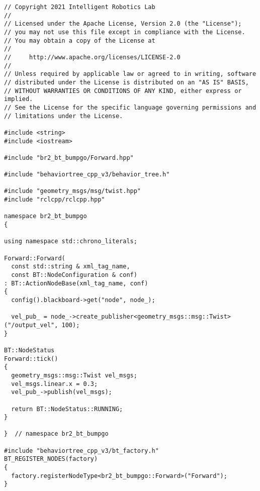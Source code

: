  \footnotesize
\begin{tcolorbox}[sharp corners, colframe=gray!80, colback=LightGray, left=0pt, top=0pt, bottom=0pt, title=\texttt{br2\_bt\_bumpgo/src/br2\_bt\_bumpgo/Forward.cpp}]
  \begin{verbatim}
// Copyright 2021 Intelligent Robotics Lab
//
// Licensed under the Apache License, Version 2.0 (the "License");
// you may not use this file except in compliance with the License.
// You may obtain a copy of the License at
//
//     http://www.apache.org/licenses/LICENSE-2.0
//
// Unless required by applicable law or agreed to in writing, software
// distributed under the License is distributed on an "AS IS" BASIS,
// WITHOUT WARRANTIES OR CONDITIONS OF ANY KIND, either express or implied.
// See the License for the specific language governing permissions and
// limitations under the License.

#include <string>
#include <iostream>

#include "br2_bt_bumpgo/Forward.hpp"

#include "behaviortree_cpp_v3/behavior_tree.h"

#include "geometry_msgs/msg/twist.hpp"
#include "rclcpp/rclcpp.hpp"

namespace br2_bt_bumpgo
{

using namespace std::chrono_literals;

Forward::Forward(
  const std::string & xml_tag_name,
  const BT::NodeConfiguration & conf)
: BT::ActionNodeBase(xml_tag_name, conf)
{
  config().blackboard->get("node", node_);

  vel_pub_ = node_->create_publisher<geometry_msgs::msg::Twist>("/output_vel", 100);
}

BT::NodeStatus
Forward::tick()
{
  geometry_msgs::msg::Twist vel_msgs;
  vel_msgs.linear.x = 0.3;
  vel_pub_->publish(vel_msgs);

  return BT::NodeStatus::RUNNING;
}

}  // namespace br2_bt_bumpgo

#include "behaviortree_cpp_v3/bt_factory.h"
BT_REGISTER_NODES(factory)
{
  factory.registerNodeType<br2_bt_bumpgo::Forward>("Forward");
}
    \end{verbatim}
    \end{tcolorbox}
  \normalsize

